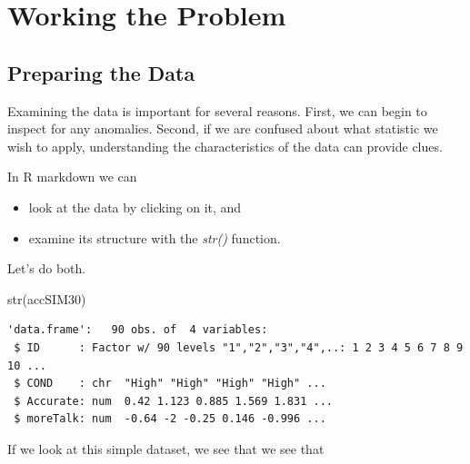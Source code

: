 \documentclass[
  11pt,
]{book}
\newenvironment{Shaded}{\begin{snugshade}}{\end{snugshade}}
\newcommand{\FunctionTok}[1]{\textcolor[rgb]{0.00,0.00,0.00}{#1}}
\newcommand{\NormalTok}[1]{#1}
\providecommand{\tightlist}{%
  \setlength{\itemsep}{0pt}\setlength{\parskip}{0pt}}
\begin{document}
\hypertarget{working-the-problem-3}{%
\section{Working the Problem}\label{working-the-problem-3}}

\hypertarget{preparing-the-data}{%
\subsection{Preparing the Data}\label{preparing-the-data}}

Examining the data is important for several reasons. First, we can begin to inspect for any anomalies. Second, if we are confused about what statistic we wish to apply, understanding the characteristics of the data can provide clues.

In R markdown we can

\begin{itemize}
\tightlist
\item
  look at the data by clicking on it, and
\item
  examine its structure with the \emph{str()} function.
\end{itemize}

Let's do both.

\begin{Shaded}
\begin{Highlighting}[]
\FunctionTok{str}\NormalTok{(accSIM30)}
\end{Highlighting}
\end{Shaded}

\begin{verbatim}
'data.frame':   90 obs. of  4 variables:
 $ ID      : Factor w/ 90 levels "1","2","3","4",..: 1 2 3 4 5 6 7 8 9 10 ...
 $ COND    : chr  "High" "High" "High" "High" ...
 $ Accurate: num  0.42 1.123 0.885 1.569 1.831 ...
 $ moreTalk: num  -0.64 -2 -0.25 0.146 -0.996 ...
\end{verbatim}

If we look at this simple dataset, we see that we see that
\end{document}
